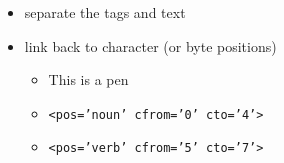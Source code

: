 \documentclass[a4paper,landscape,headrule,footrule,xetex]{foils}
\begin{document}



\begin{itemize}
\item separate the tags and text
\item link back to character (or byte positions)
  \begin{itemize}
  \item This is a pen
  \item \texttt{<pos='noun' cfrom='0'  cto='4'>}
  \item \texttt{<pos='verb' cfrom='5'  cto='7'>}
    
  \end{itemize}
\end{itemize}






\end{document}

